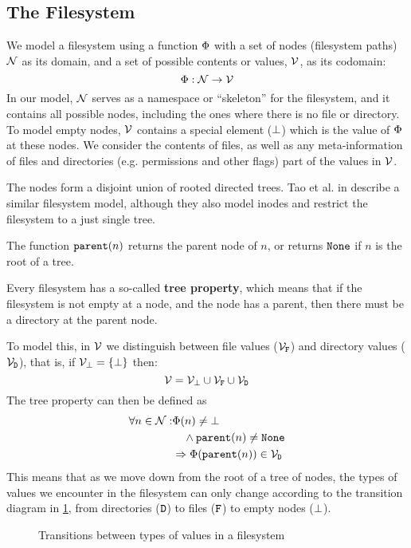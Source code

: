 
\subsection{The Filesystem}

We model a filesystem using a function $\Phi$ with a set of nodes (filesystem paths) $\mathcal{N}$ as its domain,
and a set of possible contents or values, $\mathcal{V}$, as its codomain:
\[ \Phi : \mathcal{N} \rightarrow \mathcal{V} \] 
In our model, $\mathcal{N}$ 
serves as a namespace or ``skeleton'' for the filesystem, and it
contains all possible nodes, including the ones where there is no file or directory.
To model empty nodes, $\mathcal{V}$ 
contains a special element ($\bot$) which is the value of $\Phi$ at these nodes.
We consider the contents of files, as well as any meta-information of files
and directories (e.g. permissions and other flags) part of the values in $\mathcal{V}$.

The nodes form a disjoint union of rooted directed trees.
Tao et al. in \cite{TSR} describe a similar filesystem model, although
they also model inodes and restrict the filesystem to a just single tree.
\begin{mydef}
The function $\mathtt{parent}(n)$ returns the parent node of $n$, or
returns $\mathtt{None}$ if $n$ is the root of a tree.
\end{mydef}

Every filesystem has a so-called \textbf{tree property}, which means that
if the filesystem is not empty at a node, and the node has a parent,
then there must be a directory at the parent node.

To model this, in $\mathcal{V}$ we distinguish between 
file values ($\mathcal{V}_{\mathtt{F}}$) and directory values ($\mathcal{V}_{\mathtt{D}}$), that is,
if $\mathcal{V}_{\bot} = \{\bot\}$ then:
\[ \mathcal{V} = \mathcal{V}_{\bot} \cup \mathcal{V}_{\mathtt{F}} \cup \mathcal{V}_{\mathtt{D}} \]
The tree property can then be defined as
\begin{align*}
\forall n\in\setn: &\FS(n) \neq \empt \\ %
&\quad\wedge \parent(n) \neq \topnode \\
&\Rightarrow \FS(\parent(n)) \in \setd 
\end{align*}
This means that as we move down from the root of a tree of nodes,
the types of values we encounter in the filesystem can only change according to the
transition diagram in \cref{fig_transition}, from directories ($\mathtt{D}$) to files ($\mathtt{F}$)
to empty nodes ($\bot$).

\begin{figure}[htb]

\caption{Transitions between types of values in a filesystem}\label{fig_transition}
\end{figure}

